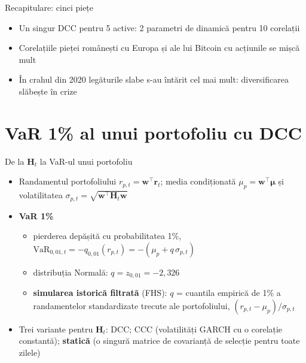 \begin{frame}{Recapitulare: cinci piețe}
\itemsize{\small}
\begin{itemize}
    \item Un singur DCC pentru 5 active: 2 parametri de dinamică pentru 10 corelații
    \item Corelațiile pieței românești cu Europa și ale lui Bitcoin cu acțiunile se mișcă mult
    \item În crahul din 2020 legăturile slabe s-au întărit cel mai mult: diversificarea slăbește în crize
\end{itemize}
\end{frame}


\section{VaR 1\% al unui portofoliu cu DCC}

\begin{frame}{De la $\mathbf{H}_t$ la VaR-ul unui portofoliu}
\itemsize{\small}
\begin{itemize}
    \item Randamentul portofoliului $r_{p,t} = \mathbf{w}^\top\mathbf{r}_t$; media condiționată $\mu_p = \mathbf{w}^\top\boldsymbol{\mu}$ și volatilitatea $\sigma_{p,t} = \sqrt{\mathbf{w}^\top\mathbf{H}_t\mathbf{w}}$
    \item \textbf{VaR 1\%}
    \begin{itemize}
        \item pierderea depășită cu probabilitatea 1\%, $\mathrm{VaR}_{0{,}01,t} = -q_{0{,}01}(r_{p,t}) = -(\mu_p + q\,\sigma_{p,t})$
        \item distribuția Normală: $q = z_{0{,}01} = -2{,}326$
        \item \textbf{simularea istorică filtrată} (FHS): $q$ = cuantila empirică de 1\% a randamentelor standardizate trecute ale portofoliului, $(r_{p,t} - \mu_p)/\sigma_{p,t}$
    \end{itemize}
    \item Trei variante pentru $\mathbf{H}_t$: DCC; CCC (volatilități GARCH cu o corelație constantă); \textbf{statică} (o singură matrice de covarianță de selecție pentru toate zilele)
\end{itemize}
\end{frame}

